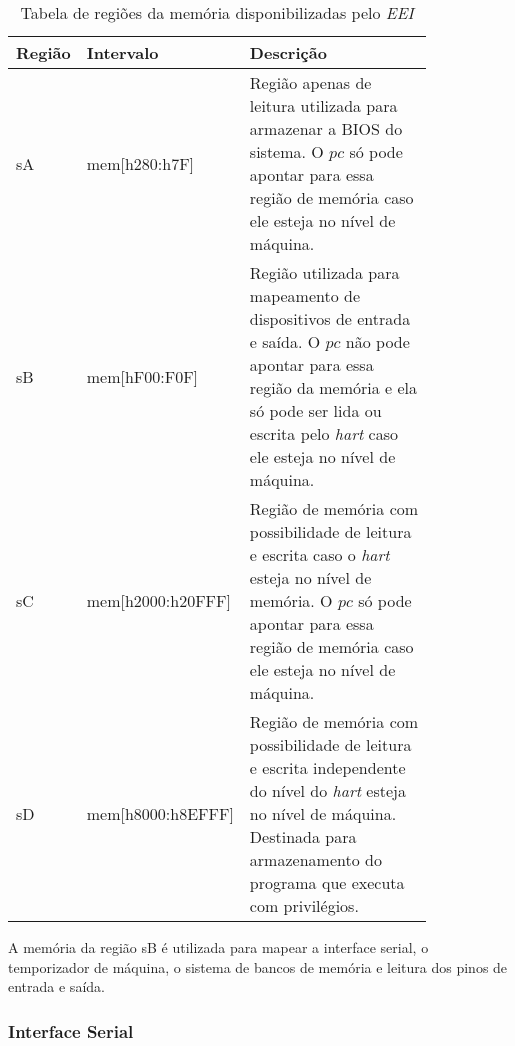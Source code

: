 \begin{table}
  \begin{tabular}{ |p{0.08\linewidth}|p{0.25\linewidth}|p{0.5\linewidth}| } 
    \hline
    Região & Intervalo & Descrição \\ \hline \hline
    sA & mem[h280:h7F] & Região apenas de leitura utilizada para armazenar a BIOS do sistema. 
    O $pc$ só pode apontar para essa região de memória caso ele esteja no nível de máquina. \\ \hline

    sB & mem[hF00:F0F] & Região utilizada para mapeamento de dispositivos de entrada e saída. O $pc$ não pode apontar para essa região da memória
    e ela só pode ser lida ou escrita pelo \emph{hart} caso ele esteja no nível de máquina. \\ \hline

    sC & mem[h2000:h20FFF] & Região de memória com possibilidade de leitura e escrita caso o \emph{hart} esteja no nível de memória.
    O $pc$ só pode apontar para essa região de memória caso ele esteja no nível de máquina. \\ \hline

    sD & mem[h8000:h8EFFF] & Região de memória com possibilidade de leitura e escrita independente do nível do  \emph{hart} esteja no nível de máquina.
    Destinada para armazenamento do programa que executa com privilégios. \\ \hline
  \end{tabular}
\caption{Tabela de regiões da memória disponibilizadas pelo \emph{EEI} \label{tab:memregions}}
\end{table}

A memória da região sB é utilizada para mapear a interface serial, o temporizador de máquina, o sistema de bancos de memória e leitura dos pinos de entrada e
saída.

\subsubsection{Interface Serial}
\label{ssec:serialio}

